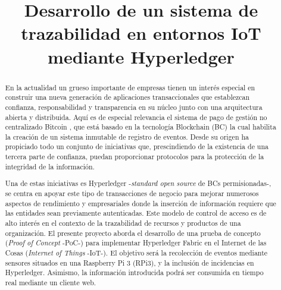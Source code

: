 \documentclass[10pt,conference,a4paper]{IEEEtran}
\begin{document}
\title{Desarrollo de un sistema de trazabilidad en entornos IoT mediante Hyperledger}

\author{
\and
{}
}

\maketitle

\begin{abstract}
    En la actualidad un grueso importante de empresas tienen un
    interés especial en construir una nueva generación de aplicaciones
    transaccionales que establezcan confianza, responsabilidad y
    transparencia en su núcleo junto con una arquitectura abierta y
    distribuida. Aquí es de especial relevancia el sistema de pago de
    gestión no centralizado Bitcoin \cite{franco:2014:UB}, que está basado
    en la tecnología Blockchain (BC) la cual habilita la creación de un
    sistema inmutable de registro de eventos. Desde su origen ha
    propiciado todo un conjunto de iniciativas que, prescindiendo de la
    existencia de una tercera parte de confianza, puedan
    proporcionar protocolos para la protección de la integridad de la
    información.

    Una de estas iniciativas es Hyperledger \cite{hyperledger:url}
    -\textit{standard open source} de BCs permisionadas-, se centra en apoyar
    este tipo de transacciones de negocio para mejorar numerosos
    aspectos de rendimiento y empresariales donde la inserción de
    información requiere que las entidades sean previamente
    autenticadas. Este modelo de control de acceso es de alto interés
    en el contexto de la trazabilidad de recursos y productos de una
    organización. El presente proyecto aborda el desarrollo de una
    prueba de concepto (\textit{Proof of Concept} -PoC-) para implementar Hyperledger Fabric \cite{hyperledgerfabric:url} en el Internet de
    las Cosas (\emph{Internet of Things} -IoT-). El objetivo será la recolección de eventos mediante sensores situados en una Raspberry Pi 3 (RPi3), y la inclusión de
    incidencias en Hyperledger. Asimismo, la información introducida
    podrá ser consumida en tiempo real mediante un cliente web.
    
\end{abstract}
\end{document}
